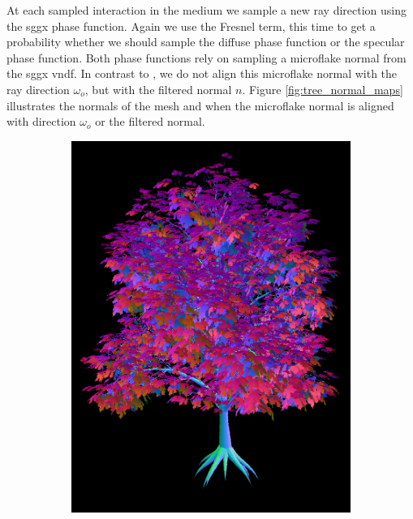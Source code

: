 At each sampled interaction in the medium we sample a new ray direction using the \ac{sggx} phase function.
Again we use the Fresnel term, this time to get a probability whether we should sample the diffuse phase function or the specular phase function.
Both phase functions rely on sampling a microflake normal from the \ac{sggx} \acl{vndf}.
In contrast to \citeauthor{sggx} \cite{sggx}, we do not align this microflake normal with the ray direction $\omega_o$, but with the filtered normal $n$.
Figure \ref{fig:tree_normal_maps} illustrates the normals of the mesh and when the microflake normal is aligned with direction $\omega_o$ or the filtered normal.
\begin{figure}[ht]
    \centering
    \begin{subfigure}[b]{0.3\linewidth}
        \centering
        \includegraphics[width=1\linewidth]{img/normal_map_mesh.png}
        \caption{}
    \end{subfigure}

\end{figure}
